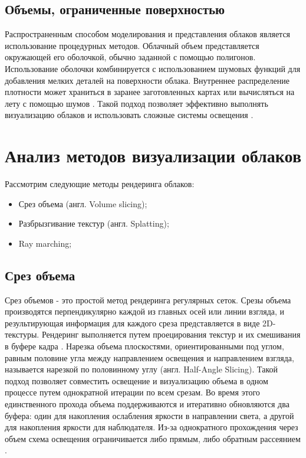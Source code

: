 \subsection{Объемы, ограниченные поверхностью} 
\label{partmediaref}
Распространенным способом моделирования и представления облаков является использование процедурных методов. Облачный объем представляется окружающей его оболочкой, обычно заданной с помощью полигонов. Использование оболочки комбинируется с использованием шумовых функций для добавления мелких деталей на поверхности облака. Внутреннее распределение плотности может храниться в заранее заготовленных картах или вычисляться на лету с помощью шумов \cite{frostbite}. Такой подход позволяет эффективно выполнять визуализацию облаков и использовать сложные системы освещения \cite{clouds}. 


\section{Анализ методов визуализации облаков}

Рассмотрим следующие методы рендеринга облаков:

\begin{itemize}
	\item Срез объема (англ. Volume slicing);
	\item Разбрызгивание текстур (англ. Splatting);
	\item Ray marching;
\end{itemize}


\subsection{Срез объема}
\label{slice}
Срез объемов - это простой метод рендеринга регулярных сеток. Срезы объема производятся перпендикулярно каждой из главных осей или линии взгляда, и результирующая информация для каждого среза представляется в виде 2D-текстуры. Рендеринг выполняется путем проецирования текстур и их смешивания в буфере кадра \cite{vs}. Нарезка объема плоскостями, ориентированными под углом, равным половине угла между направлением освещения и направлением взгляда, называется нарезкой по половинному углу (англ. Half-Angle Slicing). Такой подход позволяет совместить освещение и визуализацию объема в одном процессе путем однократной итерации по всем срезам. Во время этого единственного прохода объема поддерживаются и итеративно обновляются два буфера: один для накопления ослабления яркости в направлении света, а другой для накопления яркости для наблюдателя. Из-за однократного прохождения через объем схема освещения ограничивается либо прямым, либо обратным рассеянием \cite{clouds}. 

